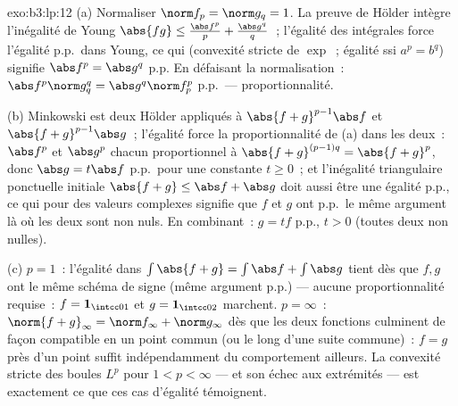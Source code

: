 \begin{solution}{exo:b3:lp:12}
(a) Normaliser $\norm f_p = \norm g_q = 1$. La preuve de
Hölder intègre l'inégalité de Young $\abs{fg} \leq
\frac{\abs f^p}p + \frac{\abs g^q}q$~; l'égalité des
intégrales force l'égalité p.p.\ dans Young, ce qui
(convexité stricte de $\exp$~; égalité ssi $a^p = b^q$)
signifie $\abs f^p = \abs g^q$ p.p. En défaisant la
normalisation~: $\abs f^p\norm g_q^q = \abs g^q\norm f_p^p$
p.p.\ --- proportionnalité.

(b) Minkowski est deux Hölder appliqués à $\abs{f +
g}^{p-1} \abs f$ et $\abs{f+g}^{p-1}\abs g$~; l'égalité
force la proportionnalité de (a) dans les deux~: $\abs f^p$
et $\abs g^p$ chacun proportionnel à $\abs{f+g}^{(p-1)q} =
\abs{f+g}^p$, donc $\abs g = t\abs f$ p.p.\ pour une
constante $t \geq 0$~; et l'inégalité triangulaire
ponctuelle initiale $\abs{f + g} \leq \abs f + \abs g$ doit
aussi être une égalité p.p., ce qui pour des valeurs
complexes signifie que $f$ et $g$ ont p.p.\ le même
argument là où les deux sont non nuls. En combinant~: $g =
tf$ p.p., $t > 0$ (toutes deux non nulles).

(c) $p = 1$~: l'égalité dans $\int\abs{f + g} = \int\abs f
+ \int\abs g$ tient dès que $f, g$ ont le même schéma de
signe (même argument p.p.) --- aucune proportionnalité
requise~: $f = \mathbf 1_{\intcc01}$ et $g = \mathbf
1_{\intcc02}$ marchent. $p = \infty$~: $\norm{f+g}_\infty
= \norm f_\infty + \norm g_\infty$ dès que les deux
fonctions culminent de façon compatible en un point commun
(ou le long d'une suite commune)~: $f = g$ près d'un point
suffit indépendamment du comportement ailleurs. La
convexité stricte des boules $L^p$ pour $1 < p < \infty$
--- et son échec aux extrémités --- est exactement ce que
ces cas d'égalité témoignent.
\end{solution}

